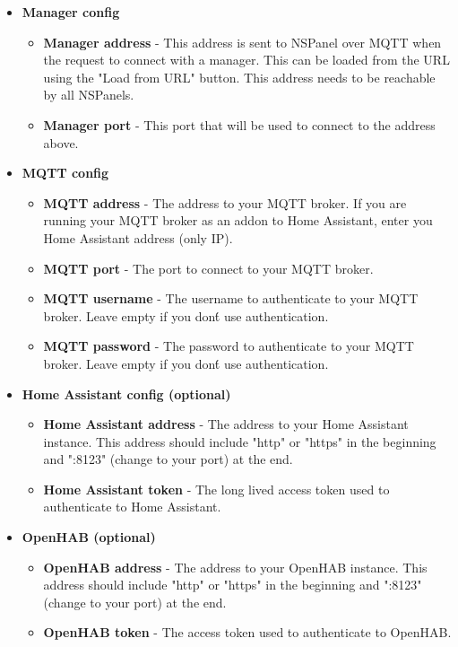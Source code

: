 \documentclass[10pt]{article}
\begin{document}
    \begin{itemize}
      \item \textbf{Manager config}
        \begin{itemize}
          \item \textbf{Manager address} - This address is sent to NSPanel over MQTT when the request to connect with a manager. This can be loaded from the URL using the "Load from URL" button. This address needs to be reachable by all NSPanels.
          \item \textbf{Manager port} - This port that will be used to connect to the address above.
        \end{itemize}
      \item \textbf{MQTT config}
        \begin{itemize}
          \item \textbf{MQTT address} - The address to your MQTT broker. If you are running your MQTT broker as an addon to Home Assistant, enter you Home Assistant address (only IP).
          \item \textbf{MQTT port} - The port to connect to your MQTT broker.
          \item \textbf{MQTT username} - The username to authenticate to your MQTT broker. Leave empty if you don\'t use authentication.
          \item \textbf{MQTT password} - The password to authenticate to your MQTT broker. Leave empty if you don\'t use authentication.
        \end{itemize}
      \item \textbf{Home Assistant config (optional)}
        \begin{itemize}
          \item \textbf{Home Assistant address} - The address to your Home Assistant instance. This address should include "http" or "https" in the beginning and ":8123" (change to your port) at the end.
          \item \textbf{Home Assistant token} - The long lived access token used to authenticate to Home Assistant.
        \end{itemize}
      \item \textbf{OpenHAB (optional)}
        \begin{itemize}
          \item \textbf{OpenHAB address} - The address to your OpenHAB instance. This address should include "http" or "https" in the beginning and ":8123" (change to your port) at the end.
          \item \textbf{OpenHAB token} - The access token used to authenticate to OpenHAB.
        \end{itemize}
    \end{itemize}
\end{document}
